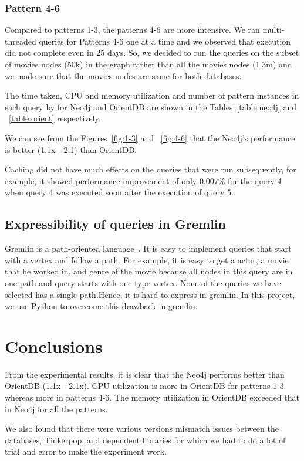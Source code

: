 \subsubsection{Pattern 4-6}

Compared to patterns 1-3, the patterns 4-6 are more intensive. We ran multi-threaded queries for Patterns 4-6 one at a time and  we observed that execution did not complete even in 25 days. So, we decided to run the queries on the subset of movies nodes (50k) in the graph rather than all the movies nodes (1.3m) and we made sure that the movies nodes are same for both databases.

The time taken, CPU and memory utilization and number of pattern instances in each query by for Neo4j and OrientDB are shown in the Tables~\ref{table:neo4j} and ~\ref{table:orient} respectively.

We can see from the Figures~\ref{fig:1-3} and ~\ref{fig:4-6} that the Neo4j's performance is better (1.1x - 2.1) than OrientDB.

Caching did not have much effects on the queries that were run subsequently, for example, it showed performance improvement of only 0.007\% for the query 4 when query 4 was executed soon after the execution of query 5.

\subsection{Expressibility of queries in Gremlin}

Gremlin is a path-oriented language~\cite{Chapter635:online}. It is easy to implement queries that start with a vertex and follow a path. For example, it is easy to get a actor, a movie that he worked in, and genre of the movie because all nodes in this query are in one path and query starts with one type vertex. None of the queries we have selected has a single path.Hence, it is hard to express in gremlin.
In this project, we use Python to overcome this drawback in gremlin. 

\section{Conclusions}
From the experimental results, it is clear that the Neo4j performs better than OrientDB (1.1x - 2.1x). CPU utilization is more in OrientDB  for patterns 1-3 whereas more in patterns 4-6. The memory utilization in OrientDB exceeded that in Neo4j for all the patterns.

We also found that there were various versions mismatch issues between the databases, Tinkerpop, and dependent libraries for which we had to do a lot of trial and error to make the experiment work.

